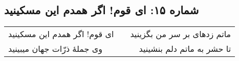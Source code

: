 \begin{center}
\section*{شماره ۱۵: ای قوم! اگر همدم این مسکینید}
\label{sec:015}
\begin{longtable}{l p{0.5cm} r}
ای قوم! اگر همدم این مسکینید
&&
ماتم زدهای بر سر من بگزینید
\\
وی جملهٔ ذرّات جهان میبینید
&&
تا حشر به ماتم دلم بنشینید
\\
\end{longtable}
\end{center}

